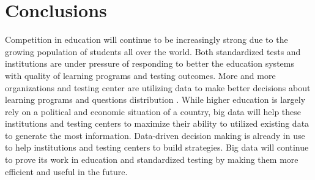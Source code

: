 \documentclass[sigconf]{acmart}
\begin{document}
\section{Conclusions}
Competition in education will continue to be increasingly strong due to the growing population of students all over the world\cite {Selingo2017}. Both standardized tests and institutions are under pressure of responding to better the education systems with quality of learning programs and testing outcomes. More and more organizations and testing center are utilizing data to make better decisions about learning programs and questions distribution \cite {Selingo2017}. While higher education is largely rely on a political and economic situation of a country, big data will help these institutions and testing centers to maximize their ability to utilized existing data to generate the most information. Data-driven decision making is already in use to help institutions and testing centers to build strategies. Big data will continue to prove its work in education and standardized testing by making them more efficient and useful in the future. 





 
\end{document}
